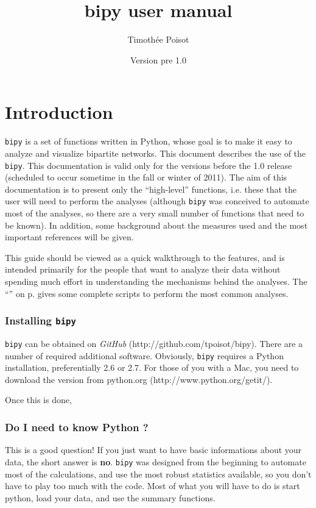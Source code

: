 \documentclass[nols,b5paper]{tufte-book}
\title[\textsc{bipy user manual}]{bipy user manual}
\author[\textsc{Timothée Poisot}]{Timothée Poisot}
\date{Version pre 1.0}
\begin{document}
\maketitle
\tableofcontents

\chapter{Introduction}

\texttt{bipy} is a set of functions written in Python, whose goal is to make it easy to analyze and visualize bipartite networks. This document describes the use of the \texttt{bipy}. This documentation is valid only for the versions before the 1.0 release (scheduled to occur sometime in the fall or winter of 2011). The aim of this documentation is to present only the ``high-level'' functions, i.e. these that the user will need to perform the analyses (although \texttt{bipy} was conceived to automate most of the analyses, so there are a very small number of functions that need to be known). In addition, some background about the measures used and the most important references will be given.

This guide should be viewed as a quick walkthrough to the features, and is intended primarily for the people that want to analyze their data without spending much effort in understanding the mechanisms behind the analyses. The ``'' on p. \pageref{c:ex} gives some complete scripts to perform the most common analyses.

\subsection{Installing \texttt{bipy}}

\texttt{bipy} can be obtained on \emph{GitHub} (http://github.com/tpoisot/bipy). There are a number of required additional software. Obviously, \texttt{bipy} requires a Python installation, preferentially 2.6 or 2.7. For those of you with a Mac, you need to download the version from python.org (http://www.python.org/getit/).

Once this is done, 

\subsection{Do I need to know Python ?}

This is a good question! If you just want to have basic informations about your data, the short answer is \textbf{no}. \texttt{bipy} was designed from the beginning to automate most of the calculations, and use the most robust statistics available, so you don't have to play too much with the code. Most of what you will have to do is start python, load your data, and use the summary functions.
\end{document}
